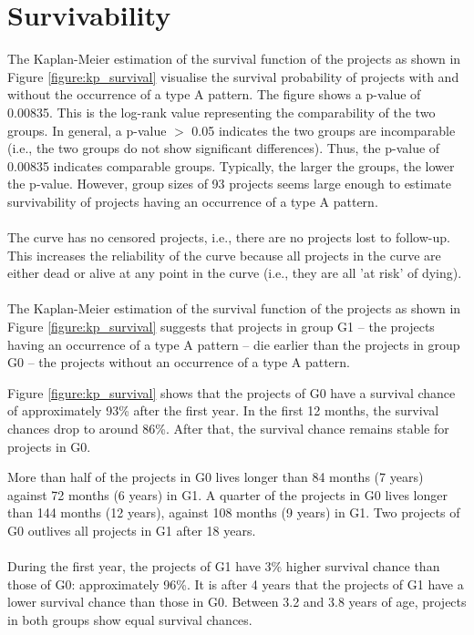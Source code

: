 \section{Survivability}
\label{section:kp_survival}
The Kaplan-Meier estimation of the survival function of the projects as shown
in Figure \ref{figure:kp_survival} visualise the survival probability of
projects with and without the occurrence of a type A pattern. The figure shows
a p-value of 0.00835. This is the log-rank value representing the comparability
of the two groups. In general, a p-value $>$ 0.05 indicates the two groups are
incomparable (i.e., the two groups do not show significant differences).
Thus, the p-value of 0.00835 indicates comparable groups. Typically, the larger
the groups, the lower the p-value. However, group sizes of 93 projects seems
large enough to estimate survivability of projects having an occurrence of a
type A pattern.

\paragraph{}
The curve has no censored projects, i.e., there are no projects lost to
follow-up. This increases the reliability of the curve because all projects in
the curve are either dead or alive at any point in the curve (i.e., they are
all 'at risk' of dying).

\paragraph{}
The Kaplan-Meier estimation of the survival function of the projects as shown
in Figure \ref{figure:kp_survival} suggests that projects in group G1 -- the
projects having an occurrence of a type A pattern -- die earlier than the
projects in group G0 -- the projects without an occurrence of a type A pattern.

Figure \ref{figure:kp_survival} shows that the projects of G0 have a survival
chance of approximately 93\% after the first year. In the first 12 months, the
survival chances drop to around 86\%. After that, the survival chance remains
stable for projects in G0.

More than half of the projects in G0 lives longer than 84 months (7 years)
against 72 months (6 years) in G1. A quarter of the projects in G0 lives longer
than 144 months (12 years), against 108 months (9 years) in G1. Two projects of
G0 outlives all projects in G1 after 18 years.

\paragraph{}
During the first year, the projects of G1 have 3\% higher survival chance than
those of G0: approximately 96\%. It is after 4 years that the projects of G1
have a lower survival chance than those in G0. Between 3.2 and 3.8 years of
age, projects in both groups show equal survival chances.\\

